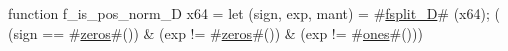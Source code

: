 function f_is_pos_norm_D   x64 = {
  let (sign, exp, mant) = #\hyperref[sailRISCVzfsplitzyD]{fsplit\_D}# (x64);
  (  (sign == #\hyperref[sailRISCVzzzeros]{zeros}#())
   & (exp  != #\hyperref[sailRISCVzzzeros]{zeros}#())
   & (exp  != #\hyperref[sailRISCVzones]{ones}#()))
}
